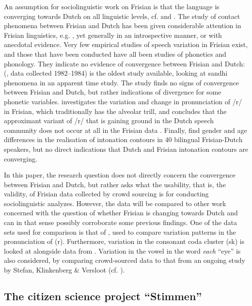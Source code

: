 \documentclass[output=paper,hidelinks]{langscibook}
\begin{document}
An assumption for sociolinguistic work on Frisian is that the language is converging towards Dutch on all linguistic levels, cf. \citet{breuker1992taalkundige} and \citet{deHaan1997contact}. The study of contact phenomena between Frisian and Dutch has been given considerable attention in Frisian linguistics, e.g. \citet{sjolin1976min}, yet generally in an introspective manner, or with anecdotal evidence. Very few empirical studies of speech variation in Frisian exist, and those that have been conducted have all been studies of phonetics and phonology. They indicate no evidence of convergence between Frisian and Dutch: \citeauthor{feitsma1987variations} (\citeyear{feitsma1987variations}, data collected 1982–1984) is the oldest study available, looking at sandhi phenomena in an apparent time study. The study finds no signs of convergence between Frisian and Dutch, but rather indications of divergence for some phonetic variables. \citet{Bezooijen2009} investigates the variation and change in pronunciation of /r/ in Frisian, which traditionally has the alveolar trill, and concludes that the approximant variant of /r/ that is gaining ground in the Dutch speech community does not occur at all in the Frisian data \citep[312]{Bezooijen2009}. Finally, \citet{nota2016word} find gender and age differences in the realisation of intonation contours in 40 bilingual Frisian-Dutch speakers, but no direct indications that Dutch and Frisian intonation contours are converging. 

In this paper, the research question does not directly concern the convergence between Frisian and Dutch, but rather asks what the usability, that is, the validity, of Frisian data collected by crowd sourcing is for conducting sociolinguistic analyzes. However, the data will be compared to other work concerned with the question of whether Frisian is changing towards Dutch and can in that sense possibly corroborate some previous findings. One of the data sets used for comparison is that of \citet{Bezooijen2009}, used to compare variation patterns in the pronunciation of (r). Furthermore, variation in the consonant coda cluster (sk) is looked at alongside data from \citet{HiltonWeening2014}. Variation in the vowel in the word \textit{each} “eye” is also considered, by comparing crowd-sourced data to that from an ongoing study by Stefan, Klinkenberg \& Versloot (cf. \citealt{stefan2014frisian}).

\subsection{The citizen science project “Stimmen”}
\end{document}
